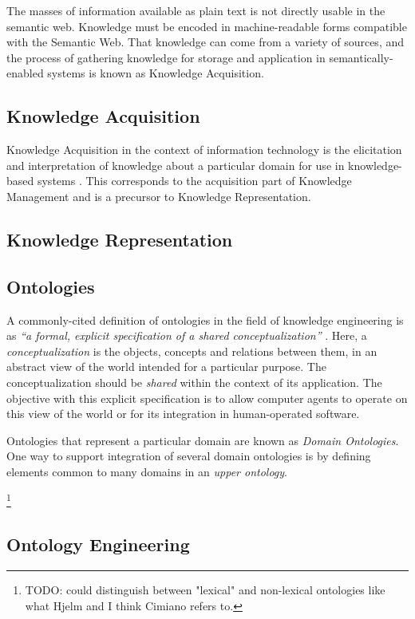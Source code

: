 \documentclass[a4paper]{report}
\newcommand{\todo}[1]{\footnote{{\color{red} TODO: #1}}}
\begin{document}
The masses of information available as plain text is not directly usable in the semantic web.
Knowledge must be encoded in machine-readable forms compatible with the Semantic Web.
That knowledge can come from a variety of sources, and the process of gathering knowledge for storage and application in semantically-enabled systems is known as Knowledge Acquisition.

\subsection{Knowledge Acquisition}

Knowledge Acquisition in the context of information technology is the elicitation and interpretation of knowledge about a particular domain for use in knowledge-based systems \citep{anjewierden1987KATools}.
This corresponds to the acquisition part of Knowledge Management and is a precursor to Knowledge Representation. 

\subsection{Knowledge Representation}


\subsection{Ontologies}
\label{sec:lit-rev:ontologies}

A commonly-cited definition of ontologies in the field of knowledge engineering is as \emph{``a formal, explicit specification of a shared conceptualization''} \cite{StuderEtAl1998KEPM}.
Here, a \emph{conceptualization} is the objects, concepts and relations between them, in an abstract view of the world intended for a particular purpose.
The conceptualization should be \emph{shared} within the context of its application.
The objective with this explicit specification is to allow computer agents to operate on this view of the world or for its integration in human-operated software.

Ontologies that represent a particular domain are known as \emph{Domain Ontologies}.
One way to support integration of several domain ontologies is by defining elements common to many domains in an \emph{upper ontology}\cite{SemanticIntegration2004Noy}.

\todo{could distinguish between "lexical" and non-lexical ontologies like what Hjelm and I think Cimiano refers to.}

\subsection{Ontology Engineering}
\end{document}
